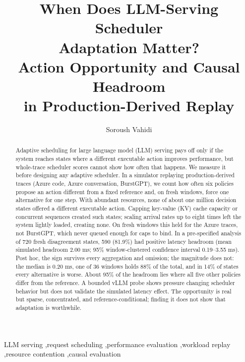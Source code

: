 \documentclass[preprint,12pt]{elsarticle}
\begin{document}
\newcommand{\anwg}{\mathrm{ANWG}}
\newcommand{\sbs}{\mathrm{SBS}}
\newcommand{\vbs}{\mathrm{VBS}}
\newcommand{\policy}[1]{\texttt{\detokenize{#1}}}

\begin{frontmatter}

\title{When Does LLM-Serving Scheduler\\
Adaptation Matter?\\
Action Opportunity and Causal Headroom\\
in Production-Derived Replay}

\author{Soroush Vahidi}

\address{Department of Computer Science, Ying Wu College of Computing,\\
New Jersey Institute of Technology, University Heights,\\
Newark, NJ 07102, USA}

\begin{abstract}
Adaptive scheduling for large language model (LLM) serving pays off only if the system reaches states where a different executable action improves performance, but whole-trace scheduler scores cannot show how often that happens. We measure it before designing any adaptive scheduler. In a simulator replaying production-derived traces (Azure code, Azure conversation, BurstGPT), we count how often six policies propose an action different from a fixed reference and, on fresh windows, force one alternative for one step. With abundant resources, none of about one million decision states offered a different executable action. Capping key-value (KV) cache capacity or concurrent sequences created such states; scaling arrival rates up to eight times left the system lightly loaded, creating none. On fresh windows this held for the Azure traces, not BurstGPT, which never queued enough for caps to bind. In a pre-specified analysis of 720 fresh disagreement states, 590 (81.9\%) had positive latency headroom (mean simulated headroom 2.00 ms; 95\% window-clustered confidence interval 0.19--3.55 ms). Post hoc, the sign survives every aggregation and omission; the magnitude does not: the median is 0.20 ms, one of 36 windows holds 88\% of the total, and in 14\% of states every alternative is worse. About 95\% of the headroom lies where all five other policies differ from the reference. A bounded vLLM probe shows pressure changing scheduler behavior but does not validate the simulated latency effect. The opportunity is real but sparse, concentrated, and reference-conditional; finding it does not show that adaptation is worthwhile.
\end{abstract}

\begin{keyword}
LLM serving \sep request scheduling \sep performance evaluation \sep workload replay \sep resource contention \sep causal evaluation
\end{keyword}

\end{frontmatter}
\end{document}

